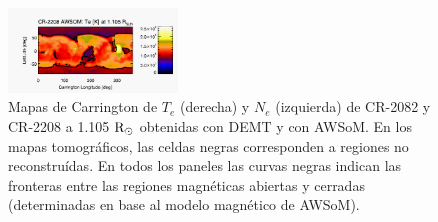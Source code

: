 \documentclass[baaa]{baaa}
\begin{document}
\begin{figure}
  \includegraphics[width=0.4\textwidth]{figuras/map_Te_awsom_2208_185_short_1105_Rsun.jpg}
    \caption{Mapas de Carrington de $T_e$ (derecha) y $N_e$ (izquierda) de CR-2082 y CR-2208 a 1.105 ${\rm R_\odot}$ obtenidas con DEMT y con AWSoM. En los mapas tomográficos, las celdas negras corresponden a regiones no reconstruídas. En todos los paneles las curvas negras indican las fronteras entre las regiones magnéticas abiertas y cerradas (determinadas en base al modelo magnético de AWSoM).}
  \label{fig-carrington}
\end{figure}


\end{document}
